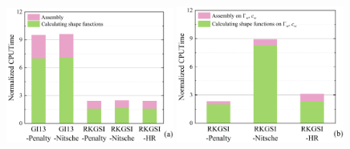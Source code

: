 \begin{figure}[H]
    \centering
    \begin{subcaptiongroup}
    \includegraphics[width=0.49\textwidth]{figure/PHR/T/Cefficiencyomega.png}
    \label{Cefficiencyomega}
    \includegraphics[width=0.49\textwidth]{figure/PHR/T/Cefficiencygamma.png}
    \label{Cefficiencygamma}
    \end{subcaptiongroup}
\caption{}
\label{Tefficiency}
\end{figure}
\newpage
